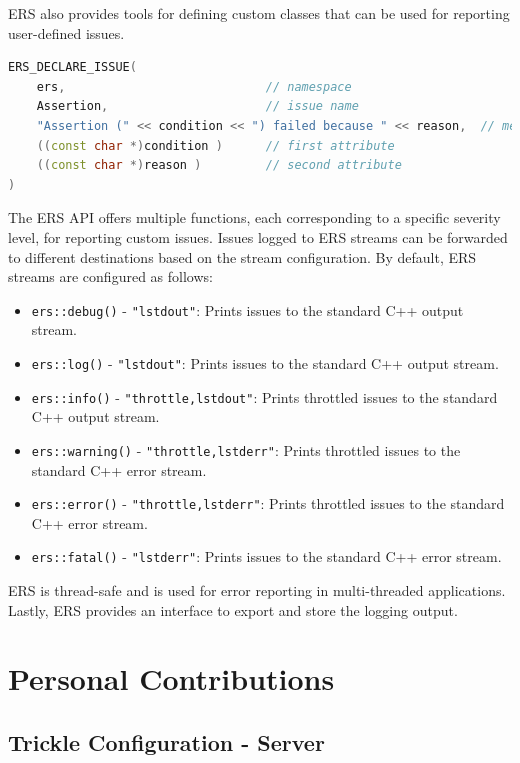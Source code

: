 \acs{ERS} also provides tools for defining custom classes that can be used for reporting user-defined issues. 

\begin{lstlisting}[language=C++, caption={ERS Assertion Issue Declaration}, label={lst:ers_assertion_issue}]
ERS_DECLARE_ISSUE(
    ers,                            // namespace
    Assertion,                      // issue name
    "Assertion (" << condition << ") failed because " << reason,  // message
    ((const char *)condition )      // first attribute
    ((const char *)reason )         // second attribute
)
\end{lstlisting}

The \acs{ERS} \acs{API} offers multiple functions, each corresponding to a specific severity level, for reporting custom issues. Issues logged to \acs{ERS} streams can be forwarded to different destinations based on the stream configuration. By default, \acs{ERS} streams are configured as follows:

\begin{itemize}
    \item \texttt{ers::debug()} - \texttt{"lstdout"}: Prints issues to the standard C++ output stream.
    \item \texttt{ers::log()} - \texttt{"lstdout"}: Prints issues to the standard C++ output stream.
    \item \texttt{ers::info()} - \texttt{"throttle,lstdout"}: Prints throttled issues to the standard C++ output stream.
    \item \texttt{ers::warning()} - \texttt{"throttle,lstderr"}: Prints throttled issues to the standard C++ error stream.
    \item \texttt{ers::error()} - \texttt{"throttle,lstderr"}: Prints throttled issues to the standard C++ error stream.
    \item \texttt{ers::fatal()} - \texttt{"lstderr"}: Prints issues to the standard C++ error stream.
\end{itemize}

\acs{ERS} is thread-safe and is used for error reporting in multi-threaded applications.\\
Lastly, \acs{ERS} provides an interface to export and store the logging output.

\section{Personal Contributions}

\subsection{Trickle Configuration - Server}

